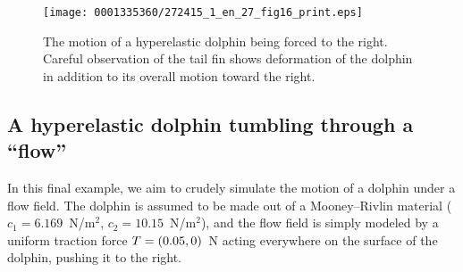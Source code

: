 \begin{figure}[!t]
\texttt{[image: 0001335360/272415\_1\_en\_27\_fig16\_print.eps]}
  \caption{The motion of a hyperelastic dolphin being forced to the
      right. Careful observation of the tail fin shows deformation of
      the dolphin in addition to its overall motion toward the right.
      \label{fig:narayanan:tumblingdolphin}}\vspace*{-3pt}%
\end{figure}

\subsection{A hyperelastic dolphin tumbling through a ``flow''}

In this final example, we aim to crudely simulate the motion of a
dolphin under a flow field. The dolphin is assumed to be made out of a
Mooney--Rivlin material ($c_{1} = 6.169$~N/m$^2$, $c_{2} =
10.15$~N/m$^2$), and the flow field is simply modeled by a uniform
traction force $\mbox{$ T$} = (0.05, 0)$~N acting everywhere on the surface of
the dolphin, pushing it to the right.

